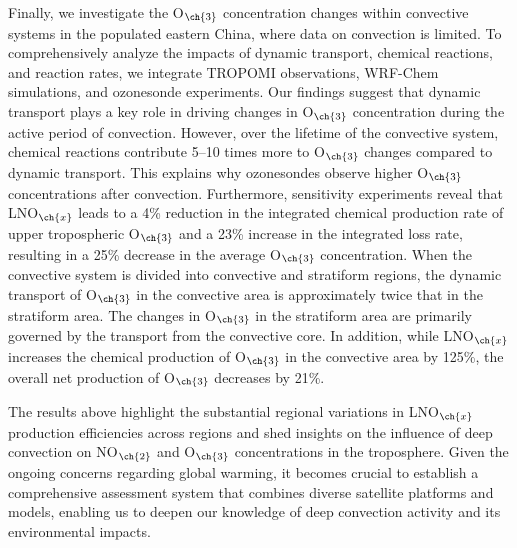{Finally, we investigate the O$_{\ch{3}}$ concentration changes within convective systems in the populated eastern China, where data on convection is limited.
To comprehensively analyze the impacts of dynamic transport, chemical reactions, and reaction rates, we integrate TROPOMI observations, WRF-Chem simulations, and ozonesonde experiments.
Our findings suggest that dynamic transport plays a key role in driving changes in O$_{\ch{3}}$ concentration during the active period of convection.
However, over the lifetime of the convective system, chemical reactions contribute 5--10 times more to O$_{\ch{3}}$ changes compared to dynamic transport.
This explains why ozonesondes observe higher O$_{\ch{3}}$ concentrations after convection.
Furthermore, sensitivity experiments reveal that LNO$_{\ch{x}}$ leads to a 4\% reduction in the integrated chemical production rate of upper tropospheric O$_{\ch{3}}$ and a 23\% increase in the integrated loss rate,
resulting in a 25\% decrease in the average O$_{\ch{3}}$ concentration.
When the convective system is divided into convective and stratiform regions,
the dynamic transport of O$_{\ch{3}}$ in the convective area is approximately twice that in the stratiform area.
The changes in O$_{\ch{3}}$ in the stratiform area are primarily governed by the transport from the convective core.
In addition, while LNO$_{\ch{x}}$ increases the chemical production of O$_{\ch{3}}$ in the convective area by 125\%, the overall net production of O$_{\ch{3}}$ decreases by 21\%.

The results above highlight the substantial regional variations in LNO$_{\ch{x}}$ production efficiencies across regions and shed insights on the influence of deep convection on NO$_{\ch{2}}$ and O$_{\ch{3}}$ concentrations in the troposphere.
Given the ongoing concerns regarding global warming, it becomes crucial to establish a comprehensive assessment system that combines diverse satellite platforms and models, enabling us to deepen our knowledge of deep convection activity and its environmental impacts.
}
